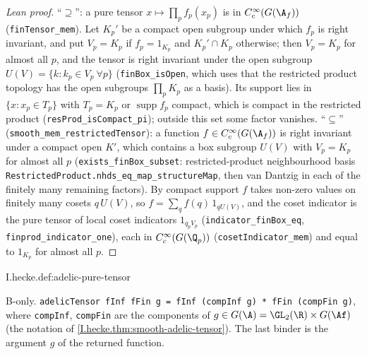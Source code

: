 \begin{proof}[Lean proof]
``$\supseteq$'': a pure tensor $x\mapsto\prod_pf_p(x_p)$ is in $C_c^\infty(G(\A_f))$ (\texttt{finTensor\_mem}). Let $K_p'$ be a compact open subgroup under which $f_p$ is right invariant, and put $V_p=K_p$ if $f_p=1_{K_p}$ and $K_p'\cap K_p$ otherwise; then $V_p=K_p$ for almost all $p$, and the tensor is right invariant under the open subgroup $U(V)=\{k:k_p\in V_p\ \forall p\}$ (\texttt{finBox\_isOpen}, which uses that the restricted product topology has the open subgroups $\prod_pK_p$ as a basis). Its support lies in $\{x:x_p\in T_p\}$ with $T_p=K_p$ or $\operatorname{supp}f_p$ compact, which is compact in the restricted product (\texttt{resProd\_isCompact\_pi}); outside this set some factor vanishes. ``$\subseteq$'' (\texttt{smooth\_mem\_restrictedTensor}): a function $f\in C_c^\infty(G(\A_f))$ is right invariant under a compact open $K'$, which contains a box subgroup $U(V)$ with $V_p=K_p$ for almost all $p$ (\texttt{exists\_finBox\_subset}: restricted-product neighbourhood basis \texttt{RestrictedProduct.nhds\_eq\_map\_structureMap}, then van Dantzig in each of the finitely many remaining factors). By compact support $f$ takes non-zero values on finitely many cosets $q\,U(V)$, so $f=\sum_qf(q)\,1_{qU(V)}$, and the coset indicator is the pure tensor of local coset indicators $1_{q_pV_p}$ (\texttt{indicator\_finBox\_eq}, \texttt{finprod\_indicator\_one}), each in $C_c^\infty(G(\Q_p))$ (\texttt{cosetIndicator\_mem}) and equal to $1_{K_p}$ for almost all $p$.
\end{proof}

\begin{definition}
\bonly
{}
\end{definition}
\begin{tfformal}{I.hecke.def:adelic-pure-tensor}
\begin{tffidelity}
B-only. \texttt{adelicTensor fInf fFin g = fInf (compInf g) * fFin (compFin g)}, where \texttt{compInf}, \texttt{compFin} are the components of $g\in G(\A)=\GL_2(\R)\times G(\Af)$ (the notation of \cref{I.hecke.thm:smooth-adelic-tensor}). The last binder is the argument $g$ of the returned function.
\end{tffidelity}
\end{tfformal}

